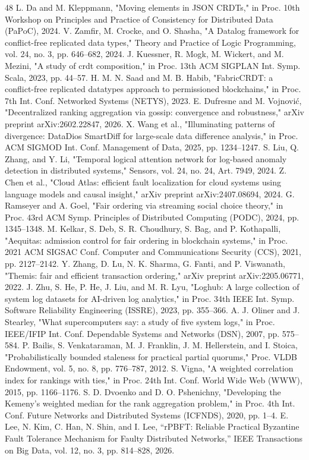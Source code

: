 \documentclass[10pt,twocolumn]{article}
\begin{document}
\begin{thebibliography}{48}
 L. Da and M. Kleppmann, "Moving elements in JSON CRDTs," in Proc. 10th Workshop on Principles and Practice of Consistency for Distributed Data (PaPoC), 2024.
 V. Zamfir, M. Crocke, and O. Shasha, "A Datalog framework for conflict-free replicated data types," Theory and Practice of Logic Programming, vol. 24, no. 3, pp. 646–682, 2024.
 J. Kuessner, R. Mogk, M. Wickert, and M. Mezini, "A study of crdt composition," in Proc. 13th ACM SIGPLAN Int. Symp. Scala, 2023, pp. 44–57.
 H. M. N. Saad and M. B. Habib, "FabricCRDT: a conflict-free replicated datatypes approach to permissioned blockchains," in Proc. 7th Int. Conf. Networked Systems (NETYS), 2023.
 E. Dufresne and M. Vojnović, "Decentralized ranking aggregation via gossip: convergence and robustness," arXiv preprint arXiv:2602.22847, 2026.
 X. Wang et al., "Illuminating patterns of divergence: DataDios SmartDiff for large-scale data difference analysis," in Proc. ACM SIGMOD Int. Conf. Management of Data, 2025, pp. 1234–1247.
 S. Liu, Q. Zhang, and Y. Li, "Temporal logical attention network for log-based anomaly detection in distributed systems," Sensors, vol. 24, no. 24, Art. 7949, 2024.
 Z. Chen et al., "Cloud Atlas: efficient fault localization for cloud systems using language models and causal insight," arXiv preprint arXiv:2407.08694, 2024.
 G. Ramseyer and A. Goel, "Fair ordering via streaming social choice theory," in Proc. 43rd ACM Symp. Principles of Distributed Computing (PODC), 2024, pp. 1345–1348.
 M. Kelkar, S. Deb, S. R. Choudhury, S. Bag, and P. Kothapalli, "Aequitas: admission control for fair ordering in blockchain systems," in Proc. 2021 ACM SIGSAC Conf. Computer and Communications Security (CCS), 2021, pp. 2127–2142.
 Y. Zhang, D. Lu, N. K. Sharma, G. Fanti, and P. Viswanath, "Themis: fair and efficient transaction ordering," arXiv preprint arXiv:2205.06771, 2022.
 J. Zhu, S. He, P. He, J. Liu, and M. R. Lyu, "Loghub: A large collection of system log datasets for AI-driven log analytics," in Proc. 34th IEEE Int. Symp. Software Reliability Engineering (ISSRE), 2023, pp. 355–366.
 A. J. Oliner and J. Stearley, "What supercomputers say: a study of five system logs," in Proc. IEEE/IFIP Int. Conf. Dependable Systems and Networks (DSN), 2007, pp. 575–584.
 P. Bailis, S. Venkataraman, M. J. Franklin, J. M. Hellerstein, and I. Stoica, "Probabilistically bounded staleness for practical partial quorums," Proc. VLDB Endowment, vol. 5, no. 8, pp. 776–787, 2012.
 S. Vigna, "A weighted correlation index for rankings with ties," in Proc. 24th Int. Conf. World Wide Web (WWW), 2015, pp. 1166–1176.
 S. D. Dvoenko and D. O. Pshenichny, "Developing the Kemeny's weighted median for the rank aggregation problem," in Proc. 4th Int. Conf. Future Networks and Distributed Systems (ICFNDS), 2020, pp. 1–4.
 E. Lee, N. Kim, C. Han, N. Shin, and I. Lee, “rPBFT: Reliable Practical Byzantine Fault Tolerance Mechanism for Faulty Distributed Networks,” IEEE Transactions on Big Data, vol. 12, no. 3, pp. 814–828, 2026.
\end{thebibliography}
\end{document}
